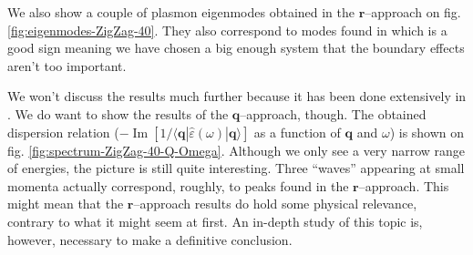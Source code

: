 \documentclass[a4paper,12pt]{article}
\begin{document}
    We also show a couple of plasmon eigenmodes obtained in the $\mathbf{r}$--approach on fig. \ref{fig:eigenmodes-ZigZag-40}. They also correspond to modes found in \cite{plasmonic2015} which is a good sign meaning we have chosen a big enough system that the boundary effects aren't too important.

    We won't discuss the results much further because it has been done extensively in \cite{plasmonic2015}. We do want to show the results of the $\mathbf{q}$--approach, though. The obtained dispersion relation ($-\operatorname{Im}[1 / \langle\mathbf{q}| \hat\varepsilon(\omega) |\mathbf{q}\rangle]$ as a function of $\mathbf{q}$ and $\omega$) is shown on fig. \ref{fig:spectrum-ZigZag-40-Q-Omega}. Although we only see a very narrow range of energies, the picture is still quite interesting. Three ``waves'' appearing at small momenta actually correspond, roughly, to peaks found in the $\mathbf{r}$--approach. This might mean that the $\mathbf{r}$--approach results do hold some physical relevance, contrary to what it might seem at first. An in-depth study of this topic is, however, necessary to make a definitive conclusion.

    
\end{document}
